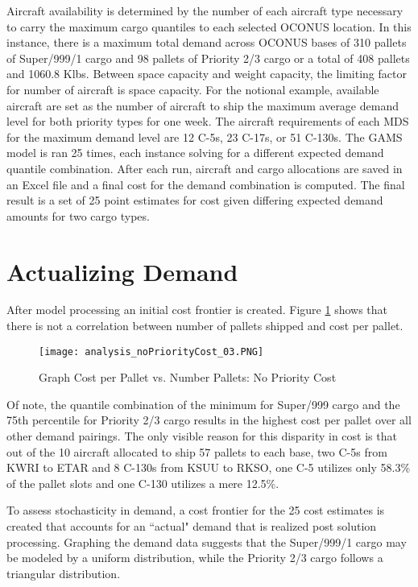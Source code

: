 Aircraft availability is determined by the number of each aircraft type necessary to carry the maximum cargo quantiles to each selected OCONUS location. In this instance, there is a maximum total demand across OCONUS bases of 310 pallets of Super/999/1 cargo and 98 pallets of Priority 2/3 cargo or a total of 408 pallets and 1060.8 Klbs. Between space capacity and weight capacity, the limiting factor for number of aircraft is space capacity.  For the notional example, available aircraft are set as the number of aircraft to ship the maximum average demand level for both priority types for one week. The aircraft requirements of each MDS for the maximum demand level are 12 C-5s, 23 C-17s, or 51 C-130s. The GAMS model is ran 25 times, each instance solving for a different expected demand quantile combination. After each run, aircraft and cargo allocations are saved in an Excel file and a final cost for the demand combination is computed. The final result is a set of 25 point estimates for cost given differing expected demand amounts for two cargo types.   

\section{Actualizing Demand} \label{section_analysis_postprocessing}
After model processing an initial cost frontier is created. Figure \ref{fig_noPriorityCost} shows that there is not a correlation between number of pallets shipped and cost per pallet.
\begin{figure}[H]
\centering
\texttt{[image: analysis\_noPriorityCost\_03.PNG]}
\caption{Graph Cost per Pallet vs. Number Pallets: No Priority Cost}
\label{fig_noPriorityCost}
\end{figure}
Of note, the quantile combination of the minimum for Super/999 cargo and the 75th percentile for Priority 2/3 cargo results in the highest cost per pallet over all other demand pairings. The only visible reason for this disparity in cost is that out of the 10 aircraft allocated to ship 57 pallets to each base, two C-5s from KWRI to ETAR and 8 C-130s from KSUU to RKSO, one C-5 utilizes only 58.3\% of the pallet slots and one C-130 utilizes a mere 12.5\%. \par 
To assess stochasticity in demand, a cost frontier for the 25 cost estimates is created that accounts for an ``actual" demand that is realized post solution processing. Graphing the demand data suggests that the Super/999/1 cargo may be modeled by a uniform distribution, while the Priority 2/3 cargo follows a triangular distribution.

